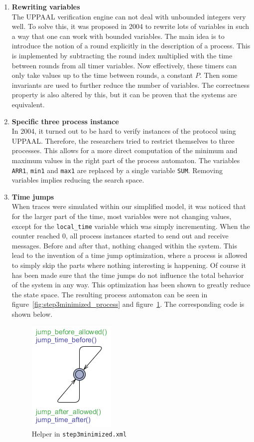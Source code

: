 \documentclass[a4paper,10pt]{article}
\newcommand{\UPPAAL}{UPPAAL\xspace}
\newcommand{\newsimple}{our simplified model\xspace}
\begin{document}
\begin{enumerate}
\item \textbf{Rewriting variables} \\
	The \UPPAAL verification engine can not deal with unbounded integers very well. To solve this, it was proposed in 2004 to rewrite lots of variables in such a way that one can work with bounded variables. The main idea is to introduce the notion of a round explicitly in the description of a process. This is implemented by subtracting the round index multiplied with the time between rounds from all timer variables. Now effectively, these timers can only take values up to the time between rounds, a constant \(P\). Then some invariants are used to further reduce the number of variables. The correctness property is also altered by this, but it can be proven that the systems are equivalent.

\item \textbf{Specific three process instance} \\
	In 2004, it turned out to be hard to verify instances of the protocol using \UPPAAL. Therefore, the researchers tried to restrict themselves to three processes. This allows for a more direct computation of the minimum and maximum values in the right part of the process automaton. The variables \texttt{ARR1}, \texttt{min1} and \texttt{max1} are replaced by a single variable \texttt{SUM}. Removing variables implies reducing the search space.

\item \textbf{Time jumps} \\
	When traces were simulated within \newsimple, it was noticed that for the larger part of the time, most variables were not changing values, except for the \texttt{local\_time} variable which was simply incrementing. When the counter reached 0, all process instances started to send out and receive messages. Before and after that, nothing changed within the system. This lead to the invention of a time jump optimization, where a process is allowed to simply skip the parts where nothing interesting is happening. Of course it has been made sure that the time jumps do not influence the total behavior of the system in any way. This optimization has been shown to greatly reduce the state space. The resulting process automaton can be seen in figure~\ref{fig:step3minimized_process} and figure~\ref{fig:step3minimized_helper}. The corresponding code is shown below.
	
\begin{figure}[H]
\center\includegraphics[scale=0.7]{step3minimized_helper}
\caption{Helper in \texttt{step3minimized.xml}\label{fig:step3minimized_helper}}
\end{figure}
	

\end{enumerate}
\end{document}
